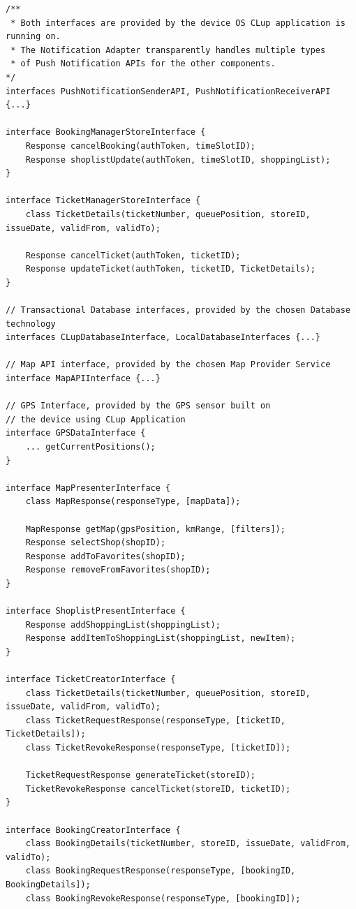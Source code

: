 \begin{lstlisting}
/** 
 * Both interfaces are provided by the device OS CLup application is running on.
 * The Notification Adapter transparently handles multiple types 
 * of Push Notification APIs for the other components.
*/
interfaces PushNotificationSenderAPI, PushNotificationReceiverAPI {...}

interface BookingManagerStoreInterface {
    Response cancelBooking(authToken, timeSlotID);
    Response shoplistUpdate(authToken, timeSlotID, shoppingList);
}

interface TicketManagerStoreInterface {
    class TicketDetails(ticketNumber, queuePosition, storeID, issueDate, validFrom, validTo);

    Response cancelTicket(authToken, ticketID);
    Response updateTicket(authToken, ticketID, TicketDetails);
}

// Transactional Database interfaces, provided by the chosen Database technology
interfaces CLupDatabaseInterface, LocalDatabaseInterfaces {...}

// Map API interface, provided by the chosen Map Provider Service
interface MapAPIInterface {...}

// GPS Interface, provided by the GPS sensor built on 
// the device using CLup Application
interface GPSDataInterface {
    ... getCurrentPositions();
}

interface MapPresenterInterface {
    class MapResponse(responseType, [mapData]);

    MapResponse getMap(gpsPosition, kmRange, [filters]);
    Response selectShop(shopID);
    Response addToFavorites(shopID);
    Response removeFromFavorites(shopID);
}

interface ShoplistPresentInterface {
    Response addShoppingList(shoppingList);
    Response addItemToShoppingList(shoppingList, newItem);
}

interface TicketCreatorInterface {
    class TicketDetails(ticketNumber, queuePosition, storeID, issueDate, validFrom, validTo);
    class TicketRequestResponse(responseType, [ticketID, TicketDetails]);
    class TicketRevokeResponse(responseType, [ticketID]);

    TicketRequestResponse generateTicket(storeID);
    TicketRevokeResponse cancelTicket(storeID, ticketID);
}

interface BookingCreatorInterface {
    class BookingDetails(ticketNumber, storeID, issueDate, validFrom, validTo);
    class BookingRequestResponse(responseType, [bookingID, BookingDetails]);
    class BookingRevokeResponse(responseType, [bookingID]);


\end{lstlisting}
